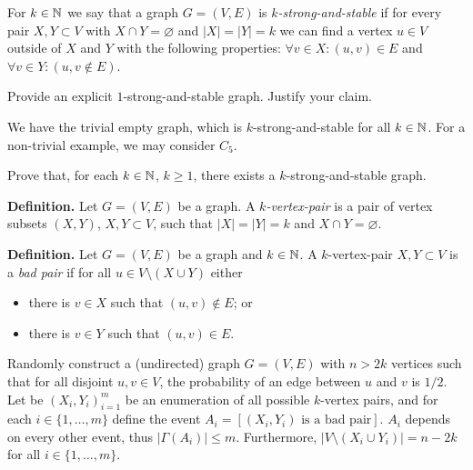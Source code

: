 For $k \in \mathbb N$ we say that a graph $G = (V,E)$ is \emph{$k$-strong-and-stable} if for every pair $X, Y \subset V$ with $X \cap Y = \varnothing$ and $\lvert X \rvert = \lvert Y \rvert = k$ we can find a vertex $u \in V$ outside of $X$ and $Y$ with the following properties: $\forall v \in X: (u, v) \in E$ and $\forall v \in Y: (u, v \not\in E)$.

\begin{subparts}
    \subpart[4] Provide an explicit $1$-strong-and-stable graph. Justify your claim.
    \begin{solution}
        We have the trivial empty graph, which is $k$-strong-and-stable for all $k \in \mathbb N$. For a non-trivial example, we may consider $C_5$.
    \end{solution}

    \subpart[15] Prove that, for each $k \in \mathbb N$, $k \geq 1$, there exists a $k$-strong-and-stable graph.
    \begin{solution}

        \vspace{0.5em}
        \textbf{Definition.} Let $G = (V,E)$ be a graph. A \emph{$k$-vertex-pair} is a pair of vertex subsets $(X, Y)$, $X, Y \subset V$, such that $\lvert X \rvert = \lvert Y \rvert = k$ and $X \cap Y = \varnothing$.
        \vspace{0.5em}

        \vspace{0.5em}
        \textbf{Definition.} Let $G = (V,E)$ be a graph and $k \in \mathbb N$. A $k$-vertex-pair $X, Y \subset V$ is a \emph{bad pair} if for all $u \in V \setminus (X \cup Y)$ either
        \begin{itemize}
            \item there is $v \in X$ such that $(u, v) \not\in E$; or
            \item there is $v \in Y$ such that $(u, v) \in E$.
        \end{itemize}
        \vspace{0.5em}

        Randomly construct a (undirected) graph $G = (V,E)$ with $n > 2k$ vertices such that for all disjoint $u, v \in V$, the probability of an edge between $u$ and $v$ is $1/2$. Let be $(X_i, Y_i)_{i=1}^m$ be an enumeration of all possible $k$-vertex pairs, and for each $i \in \{1, \ldots, m\}$ define the event $A_i = [\text{$(X_i, Y_i)$ is a bad pair}]$. $A_i$ depends on every other event, thus $\lvert \Gamma(A_i) \rvert \leq m$. Furthermore, $\lvert V \setminus (X_i \cup Y_i) \rvert = n - 2k$ for all $i \in \{1, \ldots, m\}$.


\end{solution}
\end{subparts}
